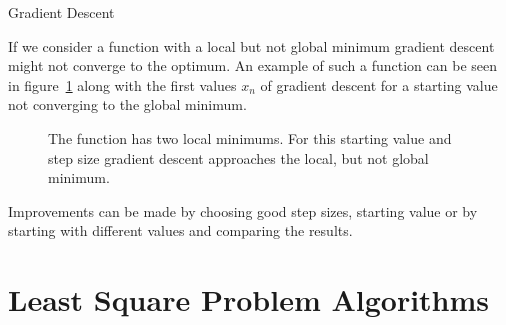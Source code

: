 \begin{algorithm}[H] \label{alg:gradient_descent}
	\SetAlgoLined
	\DontPrintSemicolon
	\LinesNumbered
	\caption{Gradient Descent}
	
	\BlankLine
\end{algorithm}

If we consider a function with a local but not global minimum gradient descent might not converge to the optimum. An example of such a function can be seen in figure~\ref{fig:grad_descent_global_min_not_found} along with the first values $x_n$ of gradient descent for a starting value not converging to the global minimum.

\begin{figure}[h]
	\centering
	\caption{The function has two local minimums. For this starting value and step size gradient descent approaches the local, but not global minimum.}
	\label{fig:grad_descent_global_min_not_found}
\end{figure}

Improvements can be made by choosing good step sizes, starting value or by starting with different values and comparing the results.

\section{Least Square Problem Algorithms}


